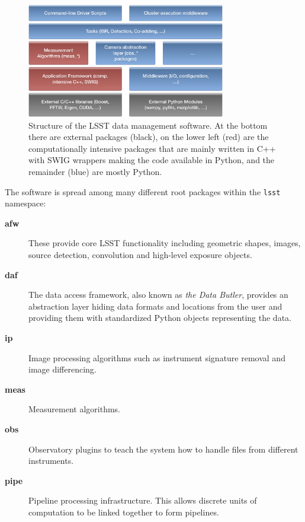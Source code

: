\documentclass[]{spie}  %
\begin{document}
\begin{figure} [t]
\begin{center}
\includegraphics[height=5cm]{Software-Layers}
\end{center}
\caption[layers]
{\label{fig:layers}
Structure of the LSST data management software.
At the bottom there are external packages (black), on the lower left (red) are the computationally intensive packages that are mainly written in C++ with SWIG wrappers making the code available in Python, and the remainder (blue) are mostly Python.}
\end{figure}

The software is spread among many different root packages within the \texttt{lsst} namespace:

\begin{description}
\item[\textbf{afw}] These provide core LSST functionality including geometric shapes, images, source detection, convolution and high-level exposure objects.

\item[\textbf{daf}] The data access framework, also known as \emph{the Data Butler}, provides an abstraction layer hiding data formats and locations from the user and providing them with standardized Python objects representing the data.

\item[\textbf{ip}] Image processing algorithms such as instrument signature removal and image differencing.

\item[\textbf{meas}] Measurement algorithms.

\item[\textbf{obs}] Observatory plugins to teach the system how to handle files from different instruments.

\item[\textbf{pipe}] Pipeline processing infrastructure. This allows discrete units of computation to be linked together to form pipelines.

\end{description}
\end{document}
